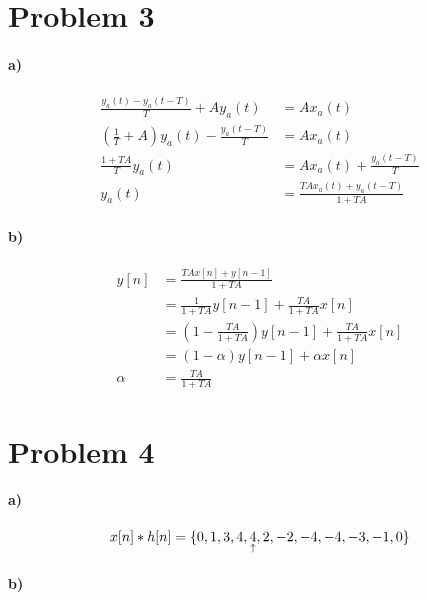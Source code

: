 \documentclass[12pt]{article}
\begin{document}
\section*{Problem 3}

\paragraph{a)}

\begin{align*}
    \frac{y_a(t)-y_a(t-T)}{T}+Ay_a(t)&=Ax_a(t)\\
    \left(\frac{1}{T}+A\right)y_a(t)-\frac{y_a(t-T)}{T}&=Ax_a(t)\\
    \frac{1+TA}{T}y_a(t)&=Ax_a(t)+\frac{y_a(t-T)}{T}\\
    y_a(t)&=\frac{TAx_a(t)+y_a(t-T)}{1+TA}
\end{align*}

\paragraph{b)}

\begin{align*}
    y[n]&=\frac{TAx[n]+y[n-1]}{1+TA}\\
    &=\frac{1}{1+TA}y[n-1]+\frac{TA}{1+TA}x[n]\\
    &=\left(1-\frac{TA}{1+TA}\right)y[n-1]+\frac{TA}{1+TA}x[n]\\
    &=(1-\alpha)y[n-1]+\alpha x[n]\\
    \alpha&=\frac{TA}{1+TA}
\end{align*}

\section*{Problem 4}

\paragraph{a)}

\[x[n]*h[n]=\{0,1,3,4,\underset{\uparrow}{4},2,-2,-4,-4,-3,-1,0\}\]

\paragraph{b)}
\end{document}
